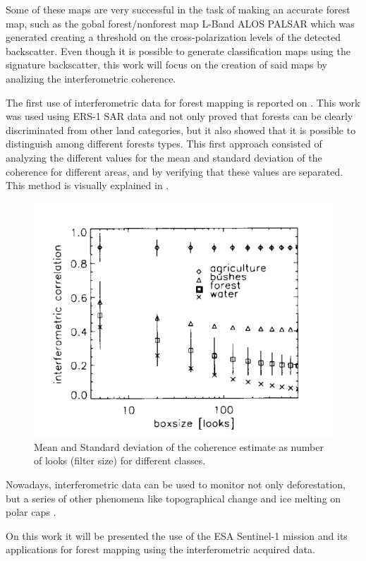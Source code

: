 Some of these maps are very successful in the task of making an accurate forest map, such as the gobal forest/nonforest map L-Band ALOS PALSAR which was generated creating a threshold on the cross-polarization levels of the detected backscatter. Even though it is possible to generate classification maps using the signature backscatter, this work will focus on the creation of said maps by analizing the interferometric coherence.

The first use of interferometric data for forest mapping is reported on \cite{first_interferometric}. This work was used using ERS-1 SAR data and not only proved that forests can be clearly discriminated from other land categories, but it also showed that it is possible to distinguish among different forests types. This first approach consisted of analyzing the different values for the mean and standard deviation of the coherence for different areas, and by verifying that these values are separated. This method is visually explained in .

\begin{figure}[H]
    \centering
    \includegraphics[width=0.7\linewidth]{Cap2/first_interferometric.png}
    \caption{Mean and Standard deviation of the coherence estimate as number of looks (filter size) for different classes.}
    \label{fig:first_interferometric_estimate}
\end{figure}

Nowadays, interferometric data can be used to monitor not only deforestation, but a series of other phenomena like topographical change and ice melting on polar caps \cite{Paolathesis}. 

On this work it will be presented the use of the ESA Sentinel-1 mission and its applications for forest mapping using the interferometric acquired data.

